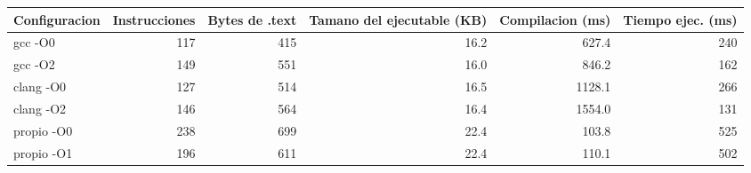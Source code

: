 \begin{tabular}{lrrrrr}\toprule
Configuracion & Instrucciones & Bytes de .text & Tamano del ejecutable (KB) & Compilacion (ms) & Tiempo ejec. (ms) \\\midrule
gcc -O0 & 117 & 415 & 16.2 & 627.4 & 240 \\
gcc -O2 & 149 & 551 & 16.0 & 846.2 & 162 \\
clang -O0 & 127 & 514 & 16.5 & 1128.1 & 266 \\
clang -O2 & 146 & 564 & 16.4 & 1554.0 & 131 \\
propio -O0 & 238 & 699 & 22.4 & 103.8 & 525 \\
propio -O1 & 196 & 611 & 22.4 & 110.1 & 502 \\
\bottomrule\end{tabular}
